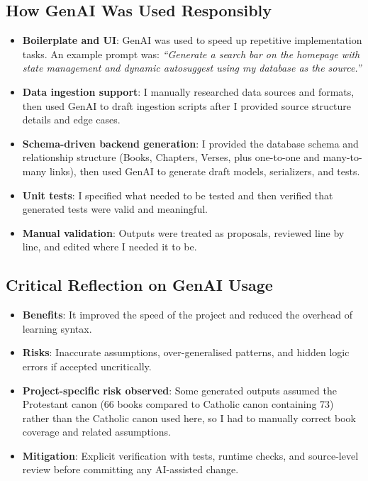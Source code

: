 \documentclass[11pt,a4paper]{article}
\begin{document}
\subsection*{How GenAI Was Used Responsibly}
\begin{itemize}[leftmargin=*]
	\item \textbf{Boilerplate and UI}: GenAI was used to speed up repetitive implementation tasks. An example prompt was: \textit{``Generate a search bar on the homepage with state management and dynamic autosuggest using my database as the source.''}
	\item \textbf{Data ingestion support}: I manually researched data sources and formats, then used GenAI to draft ingestion scripts after I provided source structure details and edge cases.
	\item \textbf{Schema-driven backend generation}: I provided the database schema and relationship structure (Books, Chapters, Verses, plus one-to-one and many-to-many links), then used GenAI to generate draft models, serializers, and tests.
	\item \textbf{Unit tests}: I specified what needed to be tested and then verified that generated tests were valid and meaningful.
	\item \textbf{Manual validation}: Outputs were treated as proposals, reviewed line by line, and edited where I needed it to be.
\end{itemize}

\subsection*{Critical Reflection on GenAI Usage}
\begin{itemize}[leftmargin=*]
	\item \textbf{Benefits}: It improved the speed of the project and reduced the overhead of learning syntax.
	\item \textbf{Risks}: Inaccurate assumptions, over-generalised patterns, and hidden logic errors if accepted uncritically.
	\item \textbf{Project-specific risk observed}: Some generated outputs assumed the Protestant canon (66 books compared to Catholic canon containing 73) rather than the Catholic canon used here, so I had to manually correct book coverage and related assumptions.
	\item \textbf{Mitigation}: Explicit verification with tests, runtime checks, and source-level review before committing any AI-assisted change.
\end{itemize}
\end{document}
